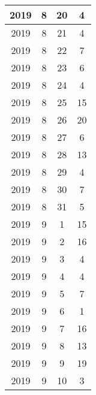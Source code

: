 \begin{longtable} {|c|c|c|c|}
\hline
2019         & 8            & 20           & 4                         \\ 
\hline
2019         & 8            & 21           & 4                         \\ 
\hline
2019         & 8            & 22           & 7                         \\ 
\hline
2019         & 8            & 23           & 6                         \\ 
\hline
2019         & 8            & 24           & 4                         \\ 
\hline
2019         & 8            & 25           & 15                        \\ 
\hline
2019         & 8            & 26           & 20                        \\ 
\hline
2019         & 8            & 27           & 6                         \\ 
\hline
2019         & 8            & 28           & 13                        \\ 
\hline
2019         & 8            & 29           & 4                         \\ 
\hline
2019         & 8            & 30           & 7                         \\ 
\hline
2019         & 8            & 31           & 5                         \\ 
\hline
2019         & 9            & 1            & 15                        \\ 
\hline
2019         & 9            & 2            & 16                        \\ 
\hline
2019         & 9            & 3            & 4                         \\ 
\hline
2019         & 9            & 4            & 4                         \\ 
\hline
2019         & 9            & 5            & 7                         \\ 
\hline
2019         & 9            & 6            & 1                         \\ 
\hline
2019         & 9            & 7            & 16                        \\ 
\hline
2019         & 9            & 8            & 13                        \\ 
\hline
2019         & 9            & 9            & 19                        \\ 
\hline
2019         & 9            & 10           & 3                         \\ 

\end{longtable}
